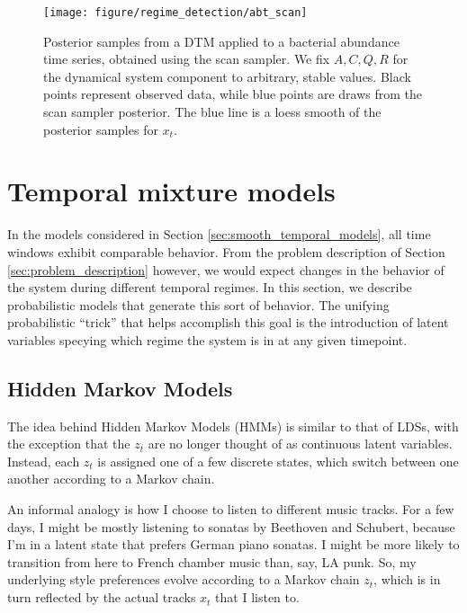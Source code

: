 \begin{figure}
  \centering
  \texttt{[image: figure/regime\_detection/abt\_scan]}
  \caption{Posterior samples from a DTM applied to a bacterial abundance time
    series, obtained using the scan sampler. We fix $A, C, Q, R$ for the
    dynamical system component to arbitrary, stable values. Black points
    represent observed data, while blue points are draws from the scan sampler
    posterior. The blue line is a loess smooth of the posterior samples for
    $x_t$.
    \label{fig:abt_scan}}
\end{figure}

\section{Temporal mixture models}
\label{sec:temporal_mixture_models}

In the models considered in Section \ref{sec:smooth_temporal_models}, all
time windows exhibit comparable behavior. From the problem description of
Section \ref{sec:problem_description} however, we would expect changes in the
behavior of the system during different temporal regimes. In this section, we
describe probabilistic models that generate this sort of behavior. The unifying
probabilistic ``trick'' that helps accomplish this goal is the introduction of
latent variables specying which regime the system is in at any given timepoint.

\subsection{Hidden Markov Models}
\label{subsec:hmms}

The idea behind Hidden Markov Models (HMMs) is similar to that of LDSs, with the
exception that the $z_{t}$ are no longer thought of as continuous latent
variables. Instead, each $z_{t}$ is assigned one of a few discrete states,
which switch between one another according to a Markov chain.

An informal analogy is how I choose to listen to different music tracks. For a
few days, I might be mostly listening to sonatas by Beethoven and Schubert,
because I'm in a latent state that prefers German piano sonatas. I might be more
likely to transition from here to French chamber music than, say, LA punk. So,
my underlying style preferences evolve according to a Markov chain $z_{t}$,
which is in turn reflected by the actual tracks $x_{t}$ that I listen to.

